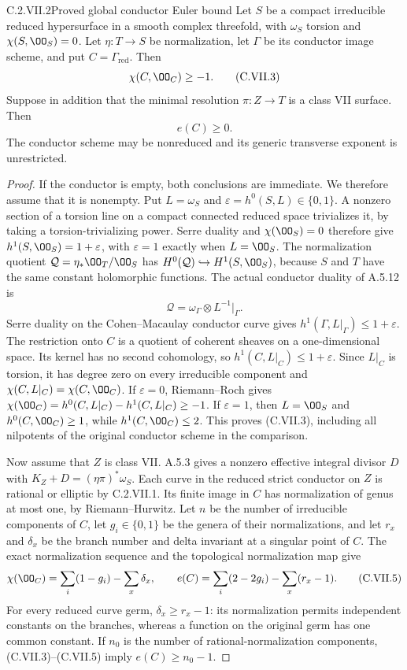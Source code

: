 \begin{idstatement}{C.2.VII.2}{Proved global conductor Euler bound}
\label{st:C.2.VII.2}
Let $S$ be a compact irreducible reduced hypersurface in
a smooth complex threefold, with $\omega_S$ torsion and
$\chi(S,\OO_S)=0$. Let $\eta:T\to S$ be normalization,
let $\Gamma$ be its conductor image scheme, and put
$C=\Gamma_{\mathrm{red}}$. Then
\[
 \chi(C,\OO_C)\ge-1.
\tag{C.VII.3}
\]
Suppose in addition that the minimal resolution
$\pi:Z\to T$ is a class VII surface. Then
\[
 e(C)\ge0.
\tag{C.VII.4}
\]
The conductor scheme may be nonreduced and its generic
transverse exponent is unrestricted.
\end{idstatement}
\begin{proof}
If the conductor is empty, both conclusions are immediate.
We therefore assume that it is nonempty.
Put $L=\omega_S$ and
$\varepsilon=h^0(S,L)\in\{0,1\}$.
A nonzero section of a torsion line on a compact
connected reduced space trivializes it, by taking a
torsion-trivializing power. Serre duality and
$\chi(\OO_S)=0$ therefore give
$h^1(S,\OO_S)=1+\varepsilon$, with
$\varepsilon=1$ exactly when $L=\OO_S$.
The normalization quotient
$\mathcal Q=\eta_*\OO_T/\OO_S$ has
$H^0(\mathcal Q)\hookrightarrow H^1(S,\OO_S)$,
because $S$ and $T$ have the same constant holomorphic
functions. The actual conductor duality of A.5.12 is
\[
 \mathcal Q=\omega_\Gamma\otimes L^{-1}|_\Gamma .
\]
Serre duality on the Cohen--Macaulay conductor curve
gives $h^1(\Gamma,L|_\Gamma)\le1+\varepsilon$.
The restriction onto $C$ is a quotient of coherent
sheaves on a one-dimensional space. Its kernel has
no second cohomology, so
$h^1(C,L|_C)\le1+\varepsilon$.
Since $L|_C$ is torsion, it has degree zero on every
irreducible component and
$\chi(C,L|_C)=\chi(C,\OO_C)$.
If $\varepsilon=0$, Riemann--Roch gives
$\chi(\OO_C)=h^0(C,L|_C)-h^1(C,L|_C)\ge-1$.
If $\varepsilon=1$, then $L=\OO_S$ and
$h^0(C,\OO_C)\ge1$, while $h^1(C,\OO_C)\le2$.
This proves (C.VII.3), including all nilpotents of
the original conductor scheme in the comparison.

Now assume that $Z$ is class VII. A.5.3 gives a
nonzero effective integral divisor $D$ with
$K_Z+D=(\eta\pi)^*\omega_S$.
Each curve in the reduced strict conductor on $Z$
is rational or elliptic by C.2.VII.1. Its finite image
in $C$ has normalization of genus at most one, by
Riemann--Hurwitz. Let $n$ be the number of irreducible
components of $C$, let $g_i\in\{0,1\}$ be the genera
of their normalizations, and let $r_x$ and $\delta_x$
be the branch number and delta invariant at a singular
point of $C$. The exact normalization sequence and
the topological normalization map give
\[
 \chi(\OO_C)=\sum_i(1-g_i)-\sum_x\delta_x,\qquad
 e(C)=\sum_i(2-2g_i)-\sum_x(r_x-1).
\tag{C.VII.5}
\]
For every reduced curve germ,
$\delta_x\ge r_x-1$: its normalization permits
independent constants on the branches, whereas a
function on the original germ has one common constant.
If $n_0$ is the number of rational-normalization
components, (C.VII.3)--(C.VII.5) imply
$e(C)\ge n_0-1$.


\end{proof}

